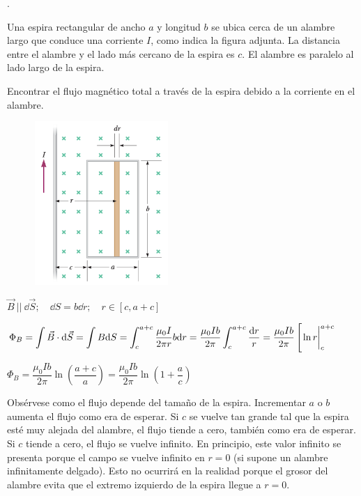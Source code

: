 \begin{prob}.

\begin{multicols}{2}
Una espira rectangular de ancho $a$ y longitud $b$ se ubica cerca de un alambre largo que conduce una corriente $I$, como indica la figura adjunta. La distancia entre el alambre y el lado más cercano de la espira es $c$. El alambre es paralelo al lado largo de la espira. 

Encontrar el flujo magnético total a través de la espira debido a la corriente en el alambre.	
\begin{figure}[H]
	\centering
	\includegraphics[width=0.45\textwidth]{imagenes/imagenes27/T27IM15.png}
\end{figure}
\end{multicols}
\end{prob}

$\vec B \ || \ \dd \vec S; \quad \dd S=b\dd r; \quad r\in[c,a+c]$

$\Phi_B=\displaystyle \int \vec B \cdot \dd \vec S = \int B \dd S =\int_c^{a+c} \dfrac {\mu_0 I}{2\pi r} b \dd r = \dfrac{\mu_0 Ib}{2 \pi} \int_c^{a+c} \dfrac{\dd r}{r}= \dfrac{\mu_0 Ib}{2 \pi} \left[ \eval{\ln r }_c^{a+c}  \right.$

$\Phi_B=\dfrac{\mu_0 Ib}{2 \pi} \ln \left( \dfrac{a+c}{a} \right) = \dfrac{\mu_0 Ib}{2 \pi} \ln \left( 1+\dfrac a c \right)$


Obsérvese como el flujo depende del tamaño de la espira. Incrementar $a$ o $b$ aumenta el flujo como era de  esperar. Si $c$ se vuelve tan grande tal que la espira esté muy alejada del alambre, el flujo tiende a cero, también como era de  esperar. \textcolor{gris}{Si $c$ tiende a cero, el flujo se vuelve infinito. En principio, este valor infinito se presenta porque el campo se vuelve infinito en $r = 0$ (si supone un alambre infinitamente delgado). Esto no ocurrirá en la realidad porque el grosor del alambre evita que el extremo izquierdo de la espira llegue a $r = 0$}.



